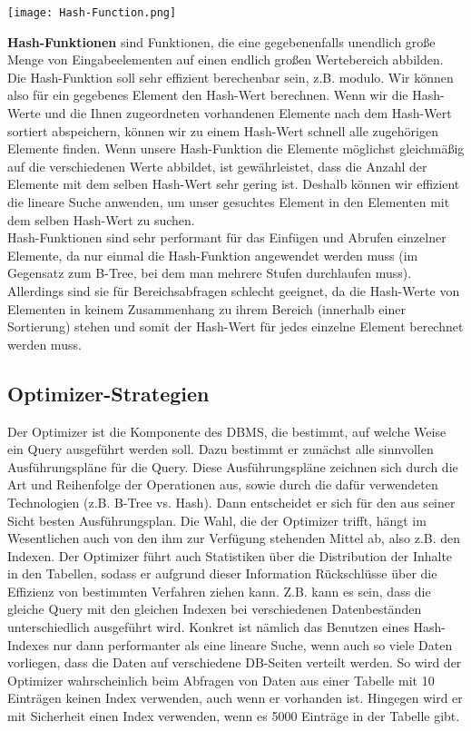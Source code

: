 \texttt{[image: Hash-Function.png]}

\textbf{Hash-Funktionen} sind Funktionen, die eine gegebenenfalls unendlich große Menge von Eingabeelementen auf einen endlich großen Wertebereich abbilden. Die Hash-Funktion soll sehr effizient berechenbar sein, z.B. modulo. Wir können also für ein gegebenes Element den Hash-Wert berechnen. Wenn wir die Hash-Werte und die Ihnen zugeordneten vorhandenen Elemente nach dem Hash-Wert sortiert abspeichern, können wir zu einem Hash-Wert schnell alle zugehörigen Elemente finden. Wenn unsere Hash-Funktion die Elemente möglichst gleichmäßig auf die verschiedenen Werte abbildet, ist gewährleistet, dass die Anzahl der Elemente mit dem selben Hash-Wert sehr gering ist. Deshalb können wir effizient die lineare Suche anwenden, um unser gesuchtes Element in den Elementen mit dem selben Hash-Wert zu suchen. \\
Hash-Funktionen sind sehr performant für das Einfügen und Abrufen einzelner Elemente, da nur einmal die Hash-Funktion angewendet werden muss (im Gegensatz zum B-Tree, bei dem man mehrere Stufen durchlaufen muss). Allerdings sind sie für Bereichsabfragen schlecht geeignet, da die Hash-Werte von Elementen in keinem Zusammenhang zu ihrem Bereich (innerhalb einer Sortierung) stehen und somit der Hash-Wert für jedes einzelne Element berechnet werden muss.

\subsection{Optimizer-Strategien}

Der Optimizer ist die Komponente des DBMS, die bestimmt, auf welche Weise ein Query ausgeführt werden soll. Dazu bestimmt er zunächst alle sinnvollen Ausführungspläne für die Query. Diese Ausführungspläne zeichnen sich durch die Art und Reihenfolge der Operationen aus, sowie durch die dafür verwendeten Technologien (z.B. B-Tree vs. Hash). Dann entscheidet er sich für den aus seiner Sicht besten Ausführungsplan. Die Wahl, die der Optimizer trifft, hängt im Wesentlichen auch von den ihm zur Verfügung stehenden Mittel ab, also z.B. den Indexen. Der Optimizer führt auch Statistiken über die Distribution der Inhalte in den Tabellen, sodass er aufgrund dieser Information Rückschlüsse über die Effizienz von bestimmten Verfahren ziehen kann. Z.B. kann es sein, dass die gleiche Query mit den gleichen Indexen bei verschiedenen Datenbeständen unterschiedlich ausgeführt wird. Konkret ist nämlich das Benutzen eines Hash-Indexes nur dann performanter als eine lineare Suche, wenn auch so viele Daten vorliegen, dass die Daten auf verschiedene DB-Seiten verteilt werden. So wird der Optimizer wahrscheinlich beim Abfragen von Daten aus einer Tabelle mit 10 Einträgen keinen Index verwenden, auch wenn er vorhanden ist. Hingegen wird er mit Sicherheit einen Index verwenden, wenn es 5000 Einträge in der Tabelle gibt. \\

